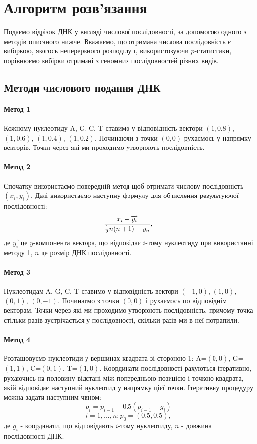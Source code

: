 \documentclass[14pt,a4paper,titlepage]{extarticle}
\begin{document}
\section{Алгоритм розв’язання}
Подаємо відрізок ДНК у вигляді числової послідовності, за допомогою одного з
методів описаного нижче. Вважаємо, що отримана числова послідовність є вибіркою,
якогось неперервного розподілу і, використовуючи $p$-статистики, порівнюємо
вибірки отримані з геномних послідовностей різних видів.

\subsection{Методи числового подання ДНК}

\paragraph{Метод 1}
Кожному нуклеотиду A, G, C, T ставимо у відповідність вектори $(1,0.8)$,
$(1,0.6)$, $(1,0.4)$, $(1,0.2)$. Починаючи з точки $(0,0)$ рухаємось у напрямку
векторів. Точки через які ми проходимо утворюють послідовність.
\paragraph{Метод 2}
Спочатку використаємо попередній метод щоб отримати числову послідовність
$(x_i,y_i)$. Далі використаємо наступну формулу для обчислення результуючої
послідовності:
\[{x_i-\overrightarrow{y_i} \over{{1\over2}n(n+1)-y_n}},\]
де $\overrightarrow{y_i}$ це $y$-компонента вектора, що відповідає $i$-тому нуклеотиду при використанні методу 1, $n$ це розмір ДНК послідовності.
\paragraph{Метод 3}
Нуклеотидам A, G, C, T ставимо у відповідність вектори $(-1,0)$, $(1,0)$,
$(0,1)$, $(0,-1)$. Починаємо з точки $(0,0)$ і рухаємось по відповіднім
векторам. Точки через які ми проходимо утворюють послідовність, причому точка
стільки разів зустрічається у послідовності, скільки разів ми в неї потрапили.
\paragraph{Метод 4}
Розташовуємо нуклеотиди у вершинах квадрата зі стороною 1: A=$(0,0)$,
G=$(1,1)$, C=$(0,1)$, T=$(1,0)$. Координати послідовності рахуються ітеративно,
рухаючись на половину відстані між попередньою позицією і точкою квадрата, якій
відповідає наступний нуклеотид у напрямку цієї точки. Ітеративну процедуру
можна задати наступним чином:
\[p_i = p_{i-1}-0.5(p_{i-1}-g_i)\]
\[i=1,...,n; p_0=(0.5,0.5),\]
де $g_i$ - координати, що відповідають $i$-тому нуклеотиду, $n$ - довжина послідовності ДНК.
\end{document}
